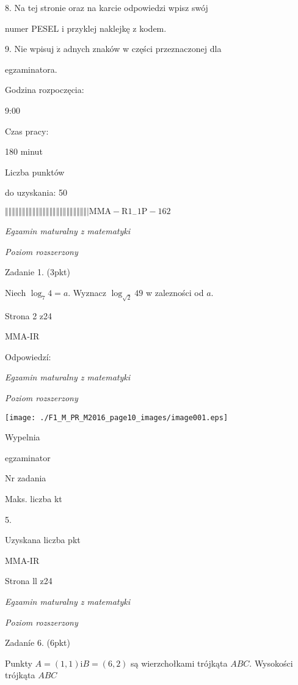 \documentclass[a4paper,12pt]{article}
\begin{document}
8. Na tej stronie oraz na karcie odpowiedzi wpisz swój

numer PESEL i przyklej naklejkę z kodem.

9. Nie wpisuj $\dot{\mathrm{z}}$ adnych znaków w części przeznaczonej dla

egzaminatora.

Godzina rozpoczęcia:

9:00

Czas pracy:

180 minut

Liczba punktów

do uzyskania: 50

$\Vert\Vert\Vert\Vert\Vert\Vert\Vert\Vert\Vert\Vert\Vert\Vert\Vert\Vert\Vert\Vert\Vert\Vert\Vert\Vert\Vert\Vert\Vert\Vert|  \mathrm{M}\mathrm{M}\mathrm{A}-\mathrm{R}1_{-}1\mathrm{P}-162$




{\it Egzamin maturalny z matematyki}

{\it Poziom rozszerzony}

Zadanie 1. (3pkt)

Niech $\log_{7}4=a$. Wyznacz $\log_{\sqrt{2}}49$ w zalezności od $a.$

Strona 2 z24

MMA-IR





Odpowiedzí:

{\it Egzamin maturalny z matematyki}

{\it Poziom rozszerzony}
\begin{center}
\texttt{[image: ./F1\_M\_PR\_M2016\_page10\_images/image001.eps]}
\end{center}
Wypelnia

egzaminator

Nr zadania

Maks. liczba kt

5.

Uzyskana liczba pkt

MMA-IR

Strona ll z24





{\it Egzamin maturalny z matematyki}

{\it Poziom rozszerzony}

Zadaníe 6. (6pkt)

Punkty $A=(1,1) \mathrm{i} B=(6,2)$ są wierzchołkami trójkąta $ABC$. Wysokości trójkąta $ABC$
\end{document}
